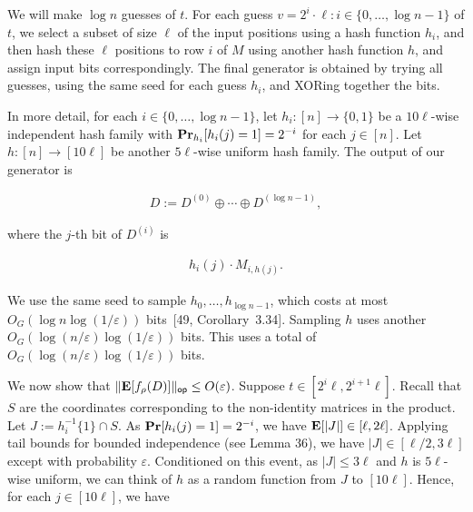 We will make $\log n$ guesses of $t$.
For each guess $v=2^{i}\cdot\ell:i\in\{0,\ldots,\log n-1\}$ of $t$, we select a subset of size $\ell$ of the input positions using a hash function $h_{i}$, and then hash these $\ell$ positions to row $i$ of $M$ using another hash function $h$, and assign input bits correspondingly.
The final generator is obtained by trying all guesses, using the same seed for each guess $h_{i}$, and XORing
together the bits.\par




In more detail, for each $i\in\{0,\ldots,\log n-1\}$, let $h_{i}\colon[n]\to\{0,1\}$ be a $10\ell$-wise independent hash family with $\mathop{\bf Pr\/}_{h_{i}}[h_{i}(j)=1]=2^{-i}$ for each $j\in[n]$.
Let $h\colon[n]\to[10\ell]$ be another $5\ell$-wise uniform hash family.
The output of our generator is\par


\[\begin{gathered}
D:=D^{(0)}\oplus\cdots\oplus D^{(\log n-1)},
\end{gathered}\]


where the $j$-th bit of $D^{(i)}$ is\par


\[\begin{gathered}
h_{i}(j)\cdot M_{i,h(j)}.
\end{gathered}\]


We use the same seed to sample $h_{0},\dots,h_{\log n-1}$, which costs at most $O_{G}(\log n\log(1/\varepsilon))$ bits [49, Corollary 3.34].
Sampling $h$ uses another $O_{G}(\log(n/\varepsilon)\log(1/\varepsilon))$ bits.
This uses a total of $O_{G}(\log(n/\varepsilon)\log(1/\varepsilon))$ bits.\par




We now show that $\lVert\mathop{\bf E\/}[f_{\rho}(D)]\rVert_{\mathsf{op}}\leq O(\varepsilon)$.
Suppose $t\in[2^{i}\ell,2^{i+1}\ell]$.
Recall that $S$ are the coordinates corresponding to the non-identity matrices in the product.
Let $J:=h_{i}^{-1}\{1\}\cap S$.
As $\mathop{\bf Pr\/}[h_{i}(j)=1]=2^{-i}$, we have $\mathop{\bf E\/}[\lvert J\rvert]\in[\ell,2\ell]$.
Applying tail bounds for bounded independence (see Lemma 36), we have $\lvert J\rvert\in[\ell/2,3\ell]$ except with probability $\varepsilon$.
Conditioned on this event, as $\lvert J\rvert\leq 3\ell$ and $h$ is $5\ell$-wise uniform, we can think of $h$ as a random function from $J$ to $[10\ell]$.
Hence, for each $j\in[10\ell]$, we have\par



